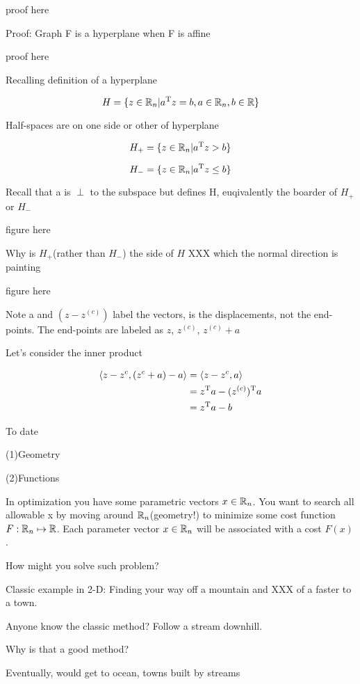 proof here


Proof: Graph F is a hyperplane when F is affine

proof here




Recalling definition of a hyperplane

$$H=\{z\in\mathbb{R}_{n}|a^{{\rm T}} z=b,a\in\mathbb{R}_{n}, b\in\mathbb{R} \}$$

Half-spaces are on one side or other of hyperplane

$$H_{+}=\{z\in\mathbb{R}_{n}|a^{{\rm T}} z>b\}$$

$$H_{-}=\{z\in\mathbb{R}_{n}|a^{{\rm T}} z\leq b\}$$

Recall that a is $\perp$ to the subspace but defines H, euqivalently the boarder of $H_{+}$ or $H_{-}$

figure here

Why is $H_{+}$(rather than $H_{-}$) the side of $H$ XXX which the normal direction is painting

figure here

Note a and $(z-z^{(c)})$ label the vectors, is the displacements, not the end-points. The end-points are labeled as $z$, $z^{(c)}$, $z^{(c)}+a$

Let's consider the inner product

\begin{align*}
\langle z-z^{c},(z^{c}+a)-a\rangle&=\langle z-z^{c},a\rangle\\
&=z^{{\rm T}} a -(z^{(c)})^{{\rm T}} a\\
&=z^{{\rm T}}a-b
\end{align*}

\vspace{0.5cm}
To date

(1)Geometry

(2)Functions

In optimization you have some parametric vectors $x\in\mathbb{R}_{n}$. You want to search all allowable x by moving around $\mathbb{R}_{n}$(geometry!) to minimize some cost function $F:\mathbb{R}_{n}\mapsto\mathbb{R}$. Each parameter vector $x\in\mathbb{R}_{n}$ will be associated with a cost $F(x)$.

How might you solve such problem?

Classic example in 2-D: Finding your way off a mountain and XXX of a faster to a town.

Anyone know the classic method? Follow a stream downhill.

Why is that a good method?

Eventually, would get to ocean, towns built by streams

